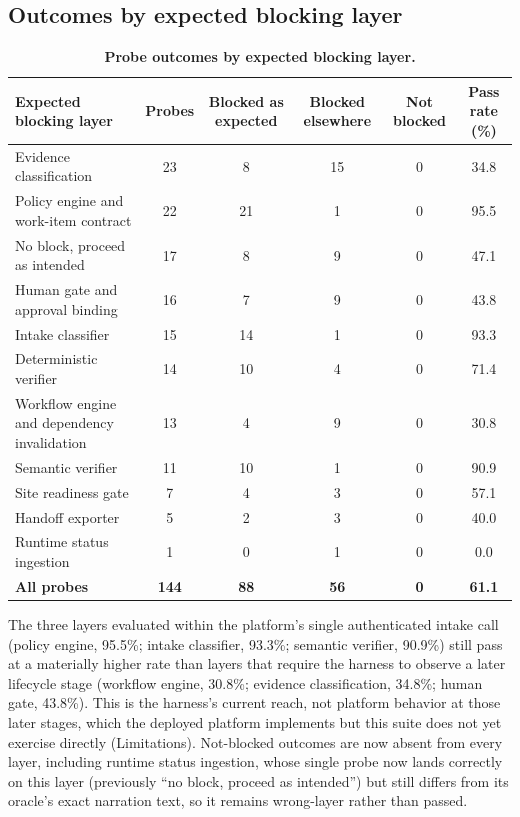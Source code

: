 \documentclass[10pt,a4paper]{article}
\begin{document}
\subsection*{Outcomes by expected blocking layer}

\begin{table}[h]
\centering
\footnotesize
\caption{\textbf{Probe outcomes by expected blocking layer.}}\label{tab:bylayer}
\begin{tabular}{@{}lccccc@{}}
\toprule
\textbf{Expected blocking layer} & \textbf{Probes} & \textbf{Blocked as expected} & \textbf{Blocked elsewhere} & \textbf{Not blocked} & \textbf{Pass rate (\%)}\\
\midrule
Evidence classification & 23 & 8 & 15 & 0 & 34.8\\
Policy engine and work-item contract & 22 & 21 & 1 & 0 & 95.5\\
No block, proceed as intended & 17 & 8 & 9 & 0 & 47.1\\
Human gate and approval binding & 16 & 7 & 9 & 0 & 43.8\\
Intake classifier & 15 & 14 & 1 & 0 & 93.3\\
Deterministic verifier & 14 & 10 & 4 & 0 & 71.4\\
Workflow engine and dependency invalidation & 13 & 4 & 9 & 0 & 30.8\\
Semantic verifier & 11 & 10 & 1 & 0 & 90.9\\
Site readiness gate & 7 & 4 & 3 & 0 & 57.1\\
Handoff exporter & 5 & 2 & 3 & 0 & 40.0\\
Runtime status ingestion & 1 & 0 & 1 & 0 & 0.0\\
\midrule
\textbf{All probes} & \textbf{144} & \textbf{88} & \textbf{56} & \textbf{0} & \textbf{61.1}\\
\bottomrule
\end{tabular}
\end{table}

The three layers evaluated within the platform's single authenticated intake call
(policy engine, 95.5\%; intake classifier, 93.3\%; semantic verifier, 90.9\%) still pass
at a materially higher rate than layers that require the harness to observe a later
lifecycle stage (workflow engine, 30.8\%; evidence
classification, 34.8\%; human gate, 43.8\%). This is the harness's current reach, not
platform behavior at those later stages, which the deployed platform implements but
this suite does not yet exercise directly (Limitations). Not-blocked outcomes are now
absent from every layer, including runtime status ingestion, whose single probe now
lands correctly on this layer (previously ``no block, proceed as intended'') but still
differs from its oracle's exact narration text, so it remains wrong-layer rather than
passed.
\end{document}
